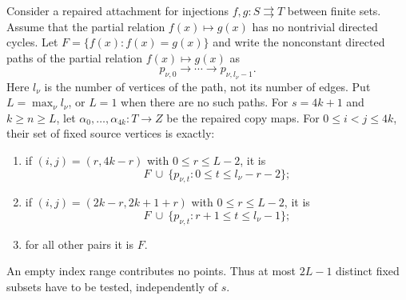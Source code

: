 \begin{lemma}
\label{C:beta-fixed-subsets}
Consider a repaired attachment for injections $f,g:S\rightrightarrows T$
between finite sets. Assume that the partial relation
$f(x)\mapsto g(x)$ has no nontrivial directed cycles.
Let $F=\{f(x):f(x)=g(x)\}$ and write the nonconstant directed paths of
the partial relation $f(x)\mapsto g(x)$ as
\[
 p_{\nu,0}\longrightarrow\cdots\longrightarrow p_{\nu,l_\nu-1}.
\]
Here $l_\nu$ is the number of vertices of the path, not its number of
edges. Put $L=\max_\nu l_\nu$, or $L=1$ when there are no such paths.
For $s=4k+1$ and $k\geq n\geq L$, let
$\alpha_0,\ldots,\alpha_{4k}:T\to Z$ be the repaired copy maps.
For $0\leq i<j\leq4k$, their set of fixed source vertices is exactly:
\begin{enumerate}
\item if $(i,j)=(r,4k-r)$ with $0\leq r\leq L-2$, it is
\[
 F\ \cup\ \{p_{\nu,t}:0\leq t\leq l_\nu-r-2\};
\]
\item if $(i,j)=(2k-r,2k+1+r)$ with $0\leq r\leq L-2$, it is
\[
 F\ \cup\ \{p_{\nu,t}:r+1\leq t\leq l_\nu-1\};
\]
\item for all other pairs it is $F$.
\end{enumerate}
An empty index range contributes no points. Thus at most $2L-1$
distinct fixed subsets have to be tested, independently of $s$.
\end{lemma}
